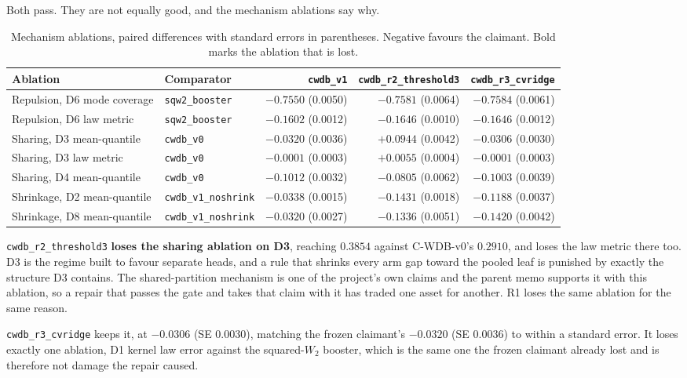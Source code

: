 \documentclass[11pt,a4paper]{article}
\theoremstyle{definition}
\theoremstyle{remark}
\begin{document}
Both pass. They are not equally good, and the mechanism ablations say why.

\begin{table}[htbp]
\centering
\caption{Mechanism ablations, paired differences with standard errors in
parentheses. Negative favours the claimant. Bold marks the ablation that is lost.}
\label{tab:ablations}
\footnotesize
\setlength{\tabcolsep}{4pt}
\begin{tabular}{@{}llrrr@{}}
\toprule
Ablation & Comparator & \texttt{cwdb\_v1} & \texttt{cwdb\_r2\_threshold3} & \texttt{cwdb\_r3\_cvridge} \\
\midrule
Repulsion, D6 mode coverage & \texttt{sqw2\_booster} & $-0.7550$ (0.0050) & $-0.7581$ (0.0064) & $-0.7584$ (0.0061) \\
Repulsion, D6 law metric & \texttt{sqw2\_booster} & $-0.1602$ (0.0012) & $-0.1646$ (0.0010) & $-0.1646$ (0.0012) \\
Sharing, D3 mean-quantile & \texttt{cwdb\_v0} & $-0.0320$ (0.0036) & $\mathbf{+0.0944}$ (0.0042) & $-0.0306$ (0.0030) \\
Sharing, D3 law metric & \texttt{cwdb\_v0} & $-0.0001$ (0.0003) & $\mathbf{+0.0055}$ (0.0004) & $-0.0001$ (0.0003) \\
Sharing, D4 mean-quantile & \texttt{cwdb\_v0} & $-0.1012$ (0.0032) & $-0.0805$ (0.0062) & $-0.1003$ (0.0039) \\
Shrinkage, D2 mean-quantile & \texttt{cwdb\_v1\_noshrink} & $-0.0338$ (0.0015) & $-0.1431$ (0.0018) & $-0.1188$ (0.0037) \\
Shrinkage, D8 mean-quantile & \texttt{cwdb\_v1\_noshrink} & $-0.0320$ (0.0027) & $-0.1336$ (0.0051) & $-0.1420$ (0.0042) \\
\bottomrule
\end{tabular}
\end{table}

\texttt{cwdb\_r2\_threshold3} \textbf{loses the sharing ablation on D3}, reaching
$0.3854$ against C-WDB-v0's $0.2910$, and loses the law metric there too. D3 is
the regime built to favour separate heads, and a rule that shrinks every arm gap
toward the pooled leaf is punished by exactly the structure D3 contains. The
shared-partition mechanism is one of the project's own claims and the parent memo
supports it with this ablation, so a repair that passes the gate and takes that
claim with it has traded one asset for another. R1 loses the same ablation for
the same reason.

\texttt{cwdb\_r3\_cvridge} keeps it, at $-0.0306$ (SE 0.0030), matching the
frozen claimant's $-0.0320$ (SE 0.0036) to within a standard error. It loses
exactly one ablation, D1 kernel law error against the squared-$W_2$ booster,
which is the same one the frozen claimant already lost and is therefore not
damage the repair caused.
\end{document}

